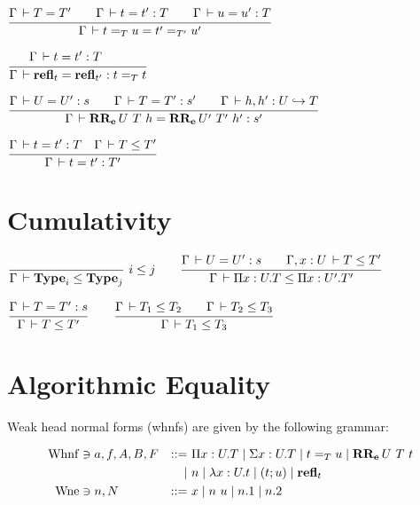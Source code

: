 \documentclass[a4paper,english]{lipics-utf8x}
\begin{document}
\begin{center}
\(
  \ru{\Gamma \der T = T' \qquad
      \Gamma \der t = t' : T \qquad
      \Gamma \der u = u' : T
    }{\Gamma \der t =_T u = t' =_{T'} u'}
\)
\end{center}

\begin{center}
\(
  \ru{\Gamma \der t = t' : T \qquad
    }{\Gamma \der \refl_t = \refl_{t'} : t =_T t}
\)
\end{center}

\begin{center}
\(
  \ru{\Gamma \der U = U' : s \qquad
      \Gamma \der T = T' : s' \qquad
      \Gamma \der h, h' : \emb{U}{T}
    }{\Gamma \der \RRe{U}{T}{h} = \RRe{U'}{T'}{h'} : s'}
\)
\end{center}


\begin{center}
\(
  \ru{\Gamma \der t = t' : T \quad
      \Gamma \der T \le T'
    }{\Gamma \der t = t' : T'}
\)
\end{center}


\section{Cumulativity}

\begin{center}
\(
  \rux{}{\Gamma \der \Type_i \le \Type_j}{i \le j}
  \qquad
  \ru{\Gamma \der U = U' : s \qquad
      \Gamma, x:U \der T \le T'
    }{\Gamma \der \Pi x:U.T \le \Pi x:U'.T'}
\)
\end{center}

\begin{center}
\(
  \ru{\Gamma \der T = T' : s
    }{\Gamma \der T \le T'}
  \qquad
  \ru{\Gamma \der T_1 \le T_2 \qquad
      \Gamma \der T_2 \le T_3
    }{\Gamma \der T_1 \le T_3}
\)
\end{center}

\section{Algorithmic Equality}


Weak head normal forms (whnfs) are given by the following grammar:

\begin{align*}
  \operatorname{Whnf} &\ni a,f,A,B,F &::=~& \Pi x:U.T \mid \Sigma x:U.T \mid t =_T u
                         \mid \operatorname{\mathbf{RR_e}}U\ T\ t \\
      &&\mid~& n \mid \lambda x:U.t \mid (t;u) \mid \operatorname{\mathbf{refl}}_t \\
  \operatorname{Wne}  &\ni n,N &::=~& x \mid n~u \mid n.1 \mid n.2
\end{align*}
\end{document}
